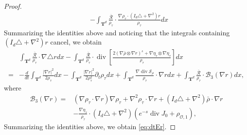 \documentclass[english]{amsart}
\theoremstyle{plain}
\theoremstyle{definition}
\theoremstyle{remark}
\theoremstyle{plain}
\theoremstyle{plain}
\theoremstyle{plain}
\def\T{{\mathbf T}}%
\def\d{{\partial}}
\DeclareMathOperator{\diver}{div}
\numberwithin{equation}{section}
\begin{document}
\begin{proof}
\begin{align*}
&-\int_{\T^d} \frac{\overline{\mathcal{R}}}{\rho_\tau}\cdot\frac{\nabla\rho_\tau\cdot(I_d\triangle+\nabla^2)r}{\rho_\tau}dx
\end{align*}
Summarizing the identities above and noticing that the integrals containing $(I_d\triangle+\nabla^2)r$ cancel, we obtain
\begin{align*}
&\int_{\T^d} \frac{\overline{\mathcal{R}}}{\rho_\tau}\cdot\nabla\triangle rdx-\int_{\T^d} \frac{\overline{\mathcal{R}}}{\rho_\tau}\cdot\diver\left[\frac{2(\nabla\bar\rho\otimes \nabla r)^s+\nabla \eta_\tau\otimes \nabla \eta_\tau}{\rho_\tau}\right]dx\\
=&-\frac{d}{dt}\int_{\T^d}\frac{|\nabla r|^2}{2\rho_\tau}dx-\int_{\T^d}\frac{|\nabla r|^2}{2\rho_\tau^2}\d_t\rho_\tau dx+\int_{\T^d} \frac{\nabla\diver \mathcal{S}_\rho}{\rho_\tau}\cdot\nabla rdx+\int_{\T^d}\frac{\overline{\mathcal{R}}}{\rho_\tau}\cdot\mathcal{B}_3(\nabla r)dx,
\end{align*}
where
\begin{equation}\label{eq:B3}
\begin{aligned}
\mathcal{B}_3(\nabla r)=&(\nabla\rho_\tau\cdot\nabla r)\nabla \rho_\tau+\nabla^2\rho_\tau\cdot\nabla r+(I_d\triangle+\nabla^2)\bar\rho\cdot\nabla r\\
&-\frac{\nabla \eta_\tau}{\rho_\tau}\cdot(I_d\triangle+\nabla^2)(e^{-s}\diver J_0+\rho_{\mathcal{O},1}),
\end{aligned}
\end{equation}
Summarizing the identities above, we obtain \eqref{eq:dtEr}.
\end{proof}
\end{document}
